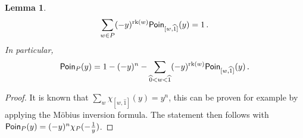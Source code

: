 \documentclass[a4paper, english,reqno, 11pt]{amsart}
\theoremstyle{plain}
\newtheorem{lemma}[theorem]{Lemma}
\theoremstyle{definition}
\DeclareMathOperator{\rk}{rk}
\DeclareMathOperator{\expsitilde}{ex\widetilde{\Psi}}
\newcommand{\zero}{\widehat{0}}
\newcommand{\one}{\widehat{1}}
\newcommand{\aaa}{\mathbf{a}}
\newcommand{\bbb}{\mathbf{b}}
\newcommand{\Poin}{\mathcal{\sf Poin}}
\begin{document}
\begin{lemma}
\label{lemma:sum poincare}
    \[\sum_{w \in P} (-y)^{\rk(w)} \Poin_{[w,\one]}(y) = 1\, .\]
    In particular,
    \[
    \Poin_P(y) = 1 - (-y)^n - \sum_{\zero < w < \one}(-y)^{\rk(w)}\Poin_{[w,\one]}(y)\, . 
    \]
\end{lemma}
\begin{proof}
    It is known that $\sum_w \chi_{[w,\one]}(y) = y^n$, this can be proven for example by applying the M\"obius inversion formula.
    The statement then follows with $\Poin_P(y) = (-y)^n \chi_P(-\tfrac{1}{y})$.
\end{proof}
\end{document}
